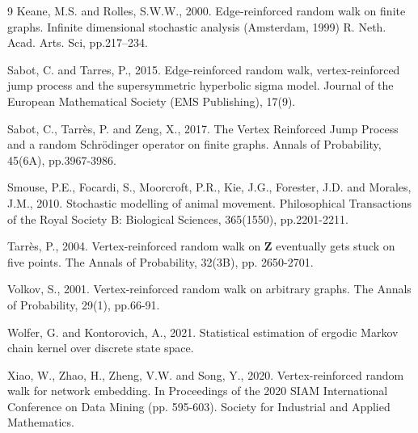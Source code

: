 \documentclass[a4paper, 11pt]{article}
\begin{document}
\begin{thebibliography}{9}
  Keane, M.S. and Rolles, S.W.W., 2000. Edge-reinforced random walk on finite graphs. Infinite dimensional stochastic analysis (Amsterdam, 1999) R. Neth. Acad. Arts. Sci, pp.217–234.

  Sabot, C. and Tarres, P., 2015. Edge-reinforced random walk, vertex-reinforced jump process and the supersymmetric hyperbolic sigma model. Journal of the European Mathematical Society (EMS Publishing), 17(9).

  Sabot, C., Tarrès, P. and Zeng, X., 2017. The Vertex Reinforced Jump Process and a random Schrödinger operator on finite graphs. Annals of Probability, 45(6A), pp.3967-3986.

  Smouse, P.E., Focardi, S., Moorcroft, P.R., Kie, J.G., Forester, J.D. and Morales, J.M., 2010. Stochastic modelling of animal movement. Philosophical Transactions of the Royal Society B: Biological Sciences, 365(1550), pp.2201-2211.

  Tarrès, P., 2004. Vertex-reinforced random walk on $\mathbf{Z}$ eventually gets stuck on five points.
  The Annals of Probability, 32(3B), pp. 2650-2701.

  Volkov, S., 2001. Vertex-reinforced random walk on arbitrary graphs. The Annals of Probability, 29(1), pp.66-91.

  Wolfer, G. and Kontorovich, A., 2021. Statistical estimation of ergodic Markov chain kernel over discrete state space.

  Xiao, W., Zhao, H., Zheng, V.W. and Song, Y., 2020. Vertex-reinforced random walk for network embedding. In Proceedings of the 2020 SIAM International Conference on Data Mining (pp. 595-603). Society for Industrial and Applied Mathematics.

\end{thebibliography}
\end{document}
